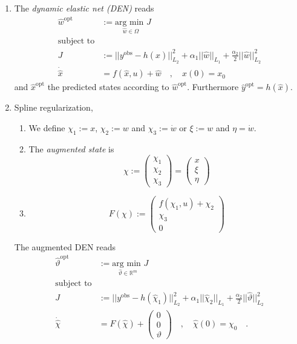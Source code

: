 \begin{enumerate}
\item The \textit{dynamic elastic net (DEN)} reads
	\begin{equation} \begin{aligned}
		\hat{w}^\text{opt} &:= \underset{\hat{w}\in \Omega}{\text{arg min } } J \\
		\text{subject to} \\
		J&:= ||y^\text{obs}-h(\hat{x})||_{L_2}^2 + \alpha_1 ||\hat{w}||_{L_1} 
		+ \frac{\alpha_2}{2}||\hat{w}||^2_{L_2} \\
		\dot{\hat{x}} &= f(\hat{x},u) + \hat{w} \quad , \quad x(0) = x_0
	\end{aligned}\end{equation}
	and $\hat{x}^\text{opt}$ the predicted states according to $\hat{w}^\text{opt}$. 
	Furthermore $\hat{y}^\text{opt}=h(\hat{x})$.
	
\item Spline regularization,
	\begin{enumerate}
	\item We define $\chi_1 := x$, $\chi_2:=w$ and $\chi_3:=\dot{w}$ or
		$\xi:=w$ and $\eta=\dot{w}$.
	\item The \textit{augmented state} is
		\begin{equation}
			\chi := \begin{pmatrix}
			\chi_1 \\ \chi_2 \\ \chi_3 
			\end{pmatrix} = \begin{pmatrix}
			x \\ \xi \\ \eta 
			\end{pmatrix}  
		\end{equation}
	\item 
		\begin{equation}
			F(\chi) := \begin{pmatrix}
			f(\chi_1,u)+ \chi_2 \\ \chi_3 \\ 0
			\end{pmatrix}
		\end{equation}
	\end{enumerate}

	The augmented DEN reads
	\begin{equation} \begin{aligned}
		\hat{\vartheta}^\text{opt} &:= \underset{\hat{\vartheta}\in 
		\mathbb{R}^m}{\text{arg min } } J \\
		\text{subject to} \\
		J&:= ||y^\text{obs}-h(\hat{\chi}_1)||_{L_2}^2 + \alpha_1 ||\hat{\chi}_2||_{L_1} 
		+ \frac{\alpha_2}{2}||\hat{\vartheta}||^2_{L_2} \\
		\dot{\hat{\chi}} &= F(\hat{\chi}) + \begin{pmatrix}
		0 \\ 0 \\ \vartheta  
		\end{pmatrix}\quad , \quad  \hat{\chi}(0) = \chi_0 \quad .
	\end{aligned}\end{equation}
\end{enumerate}



